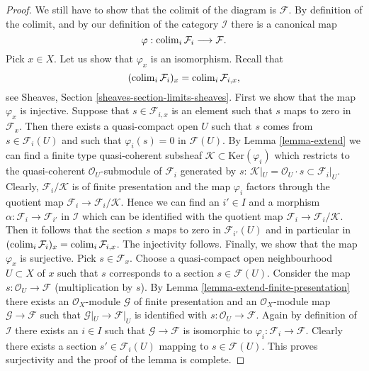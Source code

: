 \begin{proof}
\medskip\noindent
We still have to show that the colimit of the diagram is $\mathcal{F}$.
By definition of the colimit, and by our definition of the category
$\mathcal{I}$ there is a canonical map
$$
\varphi :
\mathop{\rm colim}\nolimits_i \mathcal{F}_i
\longrightarrow
\mathcal{F}.
$$
Pick $x \in X$. Let us show that $\varphi_x$ is an isomorphism.
Recall that
$$
(\mathop{\rm colim}\nolimits_i \mathcal{F}_i)_x
=
\mathop{\rm colim}\nolimits_i \mathcal{F}_{i, x},
$$
see
Sheaves, Section \ref{sheaves-section-limits-sheaves}.
First we show that the map $\varphi_x$ is injective.
Suppose that $s \in \mathcal{F}_{i, x}$ is an element
such that $s$ maps to zero in $\mathcal{F}_x$. Then there exists
a quasi-compact open $U$ such that $s$ comes from $s \in \mathcal{F}_i(U)$
and such that $\varphi_i(s) = 0$ in $\mathcal{F}(U)$.
By Lemma \ref{lemma-extend}
we can find a finite type quasi-coherent subsheaf
$\mathcal{K} \subset \text{Ker}(\varphi_i)$ which restricts to
the quasi-coherent $\mathcal{O}_U$-submodule of $\mathcal{F}_i$
generated by $s$:
$\mathcal{K}|_U = \mathcal{O}_U\cdot s \subset \mathcal{F}_i|_U$.
Clearly, $\mathcal{F}_i/\mathcal{K}$ is of finite presentation and
the map $\varphi_i$ factors through the quotient map
$\mathcal{F}_i \to \mathcal{F}_i/\mathcal{K}$. Hence we can find
an $i' \in I$ and a morphism $\alpha : \mathcal{F}_i \to \mathcal{F}_{i'}$
in $\mathcal{I}$ which can be identified with the quotient map
$\mathcal{F}_i \to \mathcal{F}_i/\mathcal{K}$. Then it follows
that the section $s$ maps to zero in $\mathcal{F}_{i'}(U)$ and
in particular in
$(\mathop{\rm colim}\nolimits_i \mathcal{F}_i)_x =
\mathop{\rm colim}\nolimits_i \mathcal{F}_{i, x}$.
The injectivity follows.
Finally, we show that the map $\varphi_x$ is surjective.
Pick $s \in \mathcal{F}_x$. Choose a quasi-compact open neighbourhood
$U \subset X$ of $x$ such that $s$ corresponds to a section
$s \in \mathcal{F}(U)$. Consider the map
$s : \mathcal{O}_U \to \mathcal{F}$ (multiplication by $s$).
By Lemma \ref{lemma-extend-finite-presentation}
there exists an $\mathcal{O}_X$-module $\mathcal{G}$
of finite presentation and an $\mathcal{O}_X$-module map
$\mathcal{G} \to \mathcal{F}$ such that $\mathcal{G}|_U \to \mathcal{F}|_U$
is identified with
$s : \mathcal{O}_U \to \mathcal{F}$.
Again by definition of $\mathcal{I}$ there exists an $i \in I$
such that $\mathcal{G} \to \mathcal{F}$ is isomorphic to
$\varphi_i : \mathcal{F}_i \to \mathcal{F}$. Clearly there exists
a section $s' \in \mathcal{F}_i(U)$ mapping to $s \in \mathcal{F}(U)$.
This proves surjectivity and the proof of the lemma is complete.
\end{proof}

